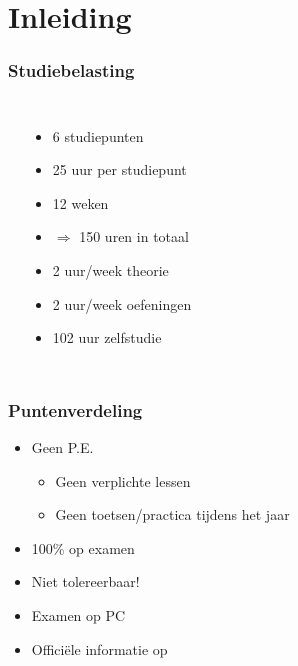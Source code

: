\section{Inleiding}

\frame{ \tableofcontents[currentsection] }

\begin{frame}
  \frametitle{Studiebelasting}
  \begin{columns}
    \begin{center}
    \end{center}
      \begin{itemize}
        \item<1-> 6 studiepunten
        \item<1-> 25 uur per studiepunt
        \item<1-> 12 weken
        \item<1-> $\Rightarrow$ 150 uren in totaal
        \item<2-> {\color{red} 2 uur/week theorie}
        \item<3-> {\color{blue} 2 uur/week oefeningen}
        \item<4-> {\color{green} 102 uur zelfstudie}
      \end{itemize}
  \end{columns}
\end{frame}

\begin{frame}
  \frametitle{Puntenverdeling}
  \begin{itemize}
    \item Geen P.E.
          \begin{itemize}
            \item Geen verplichte lessen
            \item Geen toetsen/practica tijdens het jaar
          \end{itemize}
    \item 100\% op examen
    \item Niet tolereerbaar!
    \item Examen op PC
    \item Offici\"ele informatie op \href{http://onderwijsaanbod.khleuven.be/syllabi/n/MBI08AN.htm}{}
  \end{itemize}
\end{frame}

